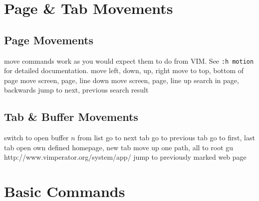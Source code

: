 
\def\content{\uppercase{vimperator}}
\def\shortcontent{Vimpr}
\def\versionnumber{1.2}  %
\def\version{v\versionnumber\ \month\ \year}


\mytitle

\shortintro
\shortintroVimpr

\section{Page \& Tab Movements}{}
\subsection{Page Movements}{move commands work as you would expect them to do
from VIM. See {\tt :h motion} for detailed documentation.}
	{move left, down, up, right}
	{move to top, bottom of page}
	{move screen, page, line down}
	{move screen, page, line up}
	{search in page, backwards}
	{jump to next, previous search result}


\subsection{Tab \& Buffer Movements}{}
	{switch to open buffer $n$ from list}
	{go to next tab}
	{go to previous tab}
	{go to first, last tab}
	{open own defined homepage, new tab}
	{move up one path, all to root}
	{gu http://www.vimperator.org/system/app/}
	{jump to previously marked web page}


\section{Basic Commands}{}
